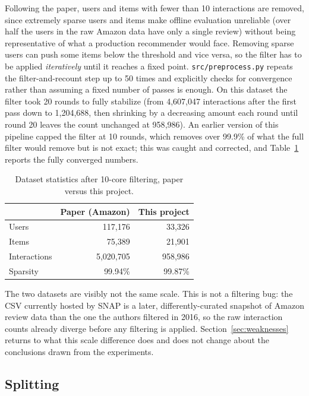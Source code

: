 Following the paper, users and items with fewer than 10 interactions are
removed, since extremely sparse users and items make offline evaluation
unreliable (over half the users in the raw Amazon data have only a single
review) without being representative of what a production recommender
would face. Removing sparse users can push some items below the threshold
and vice versa, so the filter has to be applied \emph{iteratively} until it
reaches a fixed point. \texttt{src/preprocess.py} repeats the
filter-and-recount step up to 50 times and explicitly checks for
convergence rather than assuming a fixed number of passes is enough. On
this dataset the filter took 20 rounds to fully stabilize (from
4{,}607{,}047 interactions after the first pass down to 1{,}204{,}688, then
shrinking by a decreasing amount each round until round 20 leaves the count
unchanged at 958{,}986). An earlier version of this pipeline capped the
filter at 10 rounds, which removes over 99.9\% of what the full filter
would remove but is not exact; this was caught and corrected, and
Table~\ref{tab:dataset} reports the fully converged numbers.

\begin{table}[H]
\centering
\begin{tabular}{lrr}
\toprule
 & Paper (Amazon) & This project \\
\midrule
Users        & 117{,}176   & 33{,}326 \\
Items        & 75{,}389    & 21{,}901 \\
Interactions & 5{,}020{,}705 & 958{,}986 \\
Sparsity     & 99.94\%     & 99.87\% \\
\bottomrule
\end{tabular}
\caption{Dataset statistics after 10-core filtering, paper versus this
project.}
\label{tab:dataset}
\end{table}

\medskip
The two datasets are visibly not the same scale. This is not a filtering
bug: the CSV currently hosted by SNAP is a later, differently-curated
snapshot of Amazon review data than the one the authors filtered in 2016,
so the raw interaction counts already diverge before any filtering is
applied. Section~\ref{sec:weaknesses} returns to what this scale
difference does and does not change about the conclusions drawn from the
experiments.

\subsection{Splitting}

